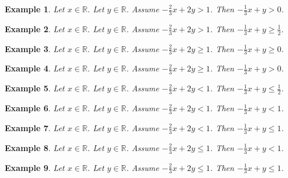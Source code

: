 \documentclass{article}
\newtheorem{example}{Example}
\begin{document}
\begin{example}
Let $x\in\mathbb{R}$. Let $y\in\mathbb{R}$. Assume $-\frac{2}{3}x+2y>1$. Then $-\frac{1}{3}x+y>0$.
\end{example}

\begin{example}
Let $x\in\mathbb{R}$. Let $y\in\mathbb{R}$. Assume $-\frac{2}{3}x+2y>1$. Then $-\frac{1}{3}x+y\ge \frac{1}{2}$.
\end{example}

\begin{example}
Let $x\in\mathbb{R}$. Let $y\in\mathbb{R}$. Assume $-\frac{2}{3}x+2y\ge 1$. Then $-\frac{1}{3}x+y\ge 0$.
\end{example}

\begin{example}
Let $x\in\mathbb{R}$. Let $y\in\mathbb{R}$. Assume $-\frac{2}{3}x+2y\ge 1$. Then $-\frac{1}{3}x+y> 0$.
\end{example}

\begin{example}
Let $x\in\mathbb{R}$. Let $y\in\mathbb{R}$. Assume $-\frac{2}{3}x+2y<1$. Then $-\frac{1}{3}x+y\le \frac{1}{2}$.
\end{example}

\begin{example}
Let $x\in\mathbb{R}$. Let $y\in\mathbb{R}$. Assume $-\frac{2}{3}x+2y<1$. Then $-\frac{1}{3}x+y<1$.
\end{example}

\begin{example}
Let $x\in\mathbb{R}$. Let $y\in\mathbb{R}$. Assume $-\frac{2}{3}x+2y<1$. Then $-\frac{1}{3}x+y\le 1$.
\end{example}

\begin{example}
Let $x\in\mathbb{R}$. Let $y\in\mathbb{R}$. Assume $-\frac{2}{3}x+2y\le 1$. Then $-\frac{1}{3}x+y<1$.
\end{example}

\begin{example}
Let $x\in\mathbb{R}$. Let $y\in\mathbb{R}$. Assume $-\frac{2}{3}x+2y\le 1$. Then $-\frac{1}{3}x+y\le 1$.
\end{example}
\end{document}
